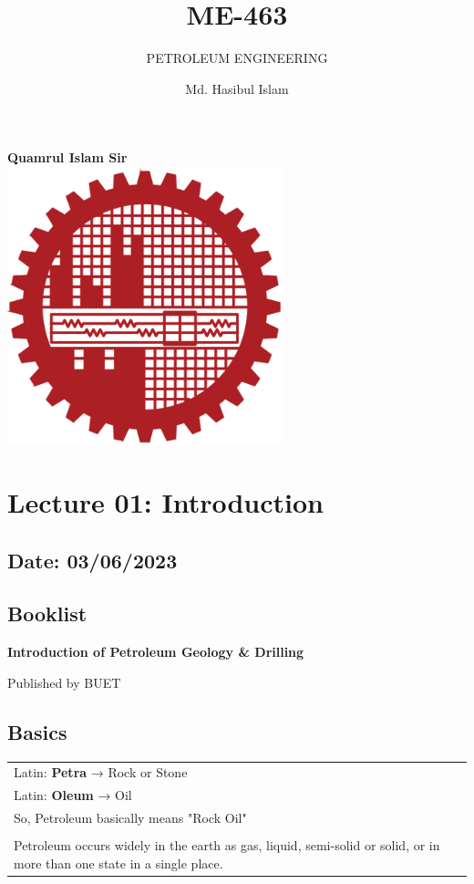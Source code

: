 \documentclass{article}
\title{ME-463}
\author{Md. Hasibul Islam}
\subtitle{PETROLEUM ENGINEERING}
\begin{document}
\begin{titlepage}
    \centering
    
    {\Huge\bfseries\maketitle}
    \textbf{Quamrul Islam Sir} \\
    \vspace{2cm}
    \includegraphics[width=8cm]{institution_logo.jpg}
    \vfill
    \vspace*{2cm}
\end{titlepage}

\tableofcontents
\pagebreak
\section{Lecture 01: Introduction} 
\subsection*{\hfill Date: 03/06/2023}

\subsection*{Booklist}

\textbf{Introduction of Petroleum Geology \& Drilling}

\hfill Published by BUET

\subsection*{Basics}

\begin{tabular}{@{}p{}@{}}
Latin: \textbf{Petra} → Rock or Stone \\
Latin: \textbf{Oleum} → Oil \\
So, Petroleum basically means "Rock Oil"\\
\\

Petroleum occurs widely in the earth as gas, liquid, semi-solid or solid, or in more than one state in a single place.
\end{tabular}
\\
\end{document}
